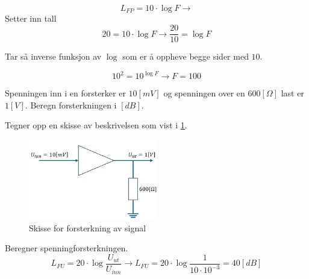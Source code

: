 \begin{solution}[name=Løsningsforslag oppgave]
\[L_{FP}=10 \cdot \log F \rightarrow \]
Setter inn tall
\[20=10 \cdot \log F \rightarrow \frac{20}{10}= \log F\]

Tar så inverse funksjon av $ \log $ som er å oppheve begge sider med $10$.

\[10^2=10^{\log F} \rightarrow F=100\]
	
\end{solution}


\vspace{0.5cm} %

\begin{question}[name=Oppgave, topic=forsterkning]
Spenningen inn i en forsterker er $10[mV]$ og spenningen over en $600[\Omega]$ last er $1[V]$. Beregn forsterkningen i $[dB]$.
\end{question}

\vspace{0.5cm} %

\begin{solution}[name=Løsningsforslag oppgave]
Tegner opp en skisse av beskrivelsen som vist i \ref{fig:forsterk2}.
	\begin{figure}[H]
		\centering
		\includegraphics[width=0.5\textwidth]{forsterkning/figurer/forsterkningxLOS.png}
		\caption{Skisse for forsterkning av signal}
		\label{fig:forsterk2}
	\end{figure}
	
	Beregner spenningforsterkningen.
\[L_{FU} = 20 \cdot \log \frac{U_{ut}}{U_{inn}} \rightarrow L_{FU}=20 \cdot \log \frac{1}{10 \cdot 10 ^{-3}}= 40 [dB]\]
	
\end{solution}


\vspace{0.5cm} %



